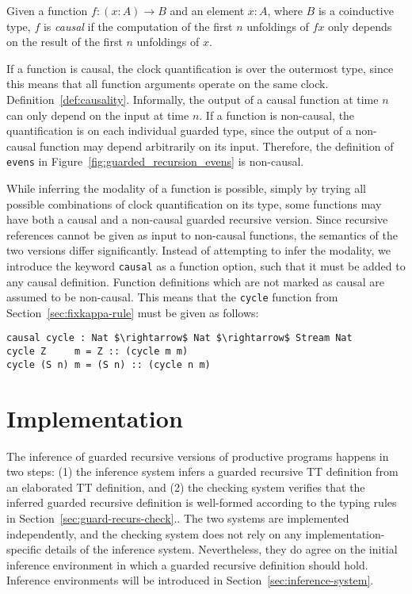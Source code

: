 \begin{definition}
\label{def:causality}
  Given a function $f : (x : A) \to B$ and an element $x : A$, where $B$ is a
  coinductive type, $f$ is \emph{causal} if the computation of the first $n$
  unfoldings of $f x$ only depends on the result of the first $n$ unfoldings of $x$.
\end{definition}

If a function is causal, the clock quantification is over the
outermost type, since this means that all function arguments operate on the same
clock. Definition~\ref{def:causality}. Informally, the
output of a causal function at time $n$ can only depend on the input at time
$n$. If a function is non-causal, the quantification is on each individual
guarded type, since the output of a non-causal function may depend arbitrarily
on its input. Therefore, the definition of \texttt{evens} in
Figure~\ref{fig:guarded_recursion_evens} is non-causal.



While inferring the modality of a function is possible, simply by trying all
possible combinations of clock quantification on its type, some functions may
have both a causal and a non-causal guarded recursive version. Since recursive
references cannot be given as input to non-causal functions, the semantics of
the two versions differ significantly. Instead of attempting to infer the
modality, we introduce the keyword \texttt{causal} as a function option, such
that it must be added to any causal definition. Function definitions which are
not marked as causal are assumed to be non-causal. This means that the
\texttt{cycle} function from Section~\ref{sec:fixkappa-rule} must be given as
follows:
\begin{lstlisting}[mathescape]
causal cycle : Nat $\rightarrow$ Nat $\rightarrow$ Stream Nat
cycle Z     m = Z :: (cycle m m)
cycle (S n) m = (S n) :: (cycle n m)
\end{lstlisting}


\section{Implementation}
The inference of guarded recursive versions of productive programs happens in
two steps: (1) the inference system infers a guarded recursive TT definition
from an elaborated TT definition, and (2) the checking system verifies that the
inferred guarded recursive definition is well-formed according to the typing
rules in Section~\ref{sec:guard-recurs-check}.. The two systems are implemented
independently, and the checking system does not rely on any
implementation-specific details of the inference system. Nevertheless, they do
agree on the initial inference environment in which a guarded recursive definition should
hold. Inference environments will be introduced in Section~\ref{sec:inference-system}.

